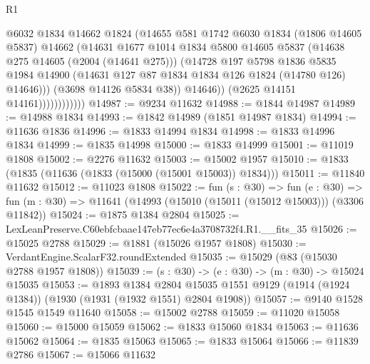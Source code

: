 \begin{lexlean}{R1}
\begin{coremodule}
                              @6032
                              @1834
                              @14662
                              @1824
                              (@14655
                                @581
                                @1742
                                @6030
                                @1834
                                (@1806 @14605 @5837)
                                @14662
                                (@14631
                                  @1677
                                  @1014
                                  @1834
                                  @5800
                                  @14605
                                  @5837
                                  (@14638 @275 @14605 (@2004 (@14641 @275)))
                                  (@14728
                                    @197
                                    @5798
                                    @1836
                                    @5835
                                    @1984
                                    @14900
                                    (@14631 @127 @87 @1834 @1834 @126 @1824 (@14780 @126) @14646)))
                                (@3698 @14126 @5834 @38))
                              @14646))
                          (@2625 @14151 @14161))))))))))))
@14987 := @9234 @11632
@14988 := @1844 @14987
@14989 := @14988 @1834
@14993 := @1842 @14989 (@1851 @14987 @1834)
@14994 := @11636 @1836
@14996 := @1833 @14994 @1834
@14998 := @1833 @14996 @1834
@14999 := @1835 @14998
@15000 := @1833 @14999
@15001 := @11019 @1808
@15002 := @2276 @11632
@15003 := @15002 @1957
@15010 := @1833 (@1835 (@11636 (@1833 (@15000 (@15001 @15003)) @1834)))
@15011 := @11840 @11632
@15012 := @11023 @1808
@15022 := fun (s : @30) =>
  fun (e : @30) => fun (m : @30) => @11641 (@14993 (@15010 (@15011 (@15012 @15003))) (@3306 @11842))
@15024 := @1875 @1384 @2804
@15025 := LexLeanPreserve.C60ebfcbaae147eb77ec6e4a3708732f4.R1.__fits_35
@15026 := @15025 @2788
@15029 := @1881 (@15026 @1957 @1808)
@15030 := VerdantEngine.ScalarF32.roundExtended
@15035 := @15029 (@83 (@15030 @2788 @1957 @1808))
@15039 := (s : @30) -> (e : @30) -> (m : @30) -> @15024 @15035
@15053 := @1893
    @1384
    @2804
    @15035
    @1551
    @9129
    (@1914 (@1924 @1384))
    (@1930 (@1931 (@1932 @1551) @2804 @1908))
@15057 := @9140 @1528 @1545 @1549 @11640
@15058 := @15002 @2788
@15059 := @11020 @15058
@15060 := @15000 @15059
@15062 := @1833 @15060 @1834
@15063 := @11636 @15062
@15064 := @1835 @15063
@15065 := @1833 @15064
@15066 := @11839 @2786
@15067 := @15066 @11632

\end{coremodule}
\end{lexlean}
